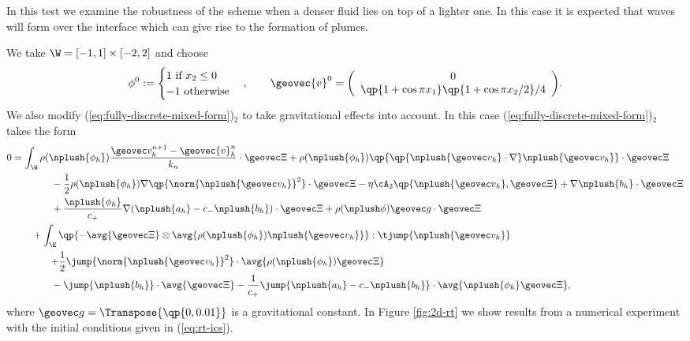 \documentclass[final]{amsart}
\numberwithin{equation}{section}
\begin{document}
{
In this test we examine the robustness of the scheme when a denser
fluid lies on top of a lighter one. In this case it is expected that
waves will form over the interface which can give rise to
the formation of plumes. 
}

{
We take $\W = [-1,1]\times [-2,2]$ and choose
\begin{equation}
  \label{eq:rt-ics}
  \phi^0 :=
  \begin{cases}
    1 \text{ if } x_2 \leq 0
    \\
    -1 \text{ otherwise}
  \end{cases},
  \qquad {\geovec{v}}^0 = 
  \bigg(
    \begin{array}{c}
      0
      \\
      {\qp{1+\cos{{\pi x_1}}} \qp{1+\cos{{{\pi x_2}/{2}}}}}/{4}
    \end{array}
    \bigg).
\end{equation}
We also modify (\ref{eq:fully-discrete-mixed-form})$_2$ to take
gravitational effects into account. In this case
(\ref{eq:fully-discrete-mixed-form})$_2$ takes the form
\begin{equation}
  \begin{split}
    0 &=
  \int_\W 
  \rho(\nplush{\phi_h}) \frac{\geovec v_h^{n+1} - {\geovec{v}}_h^n}{k_n} \cdot \geovec \Xi
  +
    \rho(\nplush{\phi_h}) \qp{ \qp{\nplush{\geovec v_h} \cdot \nabla }\nplush{\geovec v_h}} \cdot \geovec \Xi
    \\
    &\qquad\qquad-
    \frac{1}{2} \rho(\nplush{\phi_h}) \nabla\qp{\norm{\nplush{\geovec v_h}}^2} \cdot \geovec \Xi
    -
    \eta\cA_2\qp{{\nplush{\geovec v_h}},{\geovec \Xi}}
    +
    \nabla \nplush{b_h} \cdot \geovec \Xi
    \\
    &\qquad\qquad +
    \frac{\nplush{\phi_h}}{c_+}\nabla(\nplush{a_h} - c_- \nplush{b_h}) \cdot \geovec \Xi
    +
    \rho(\nplush\phi)\geovec g  \cdot \geovec \Xi
    \\
    & \qquad +
    \int_\E
    \qp{{-}\avg{ \geovec \Xi} \otimes \avg{ \rho(\nplush{\phi_h}) \nplush{\geovec v_h}}}: \tjump{\nplush{\geovec v_h}} 
    \\&\qquad \qquad {+}
    \frac{1}{2} \jump{\norm{\nplush{\geovec v_h}}^2}\cdot \avg{\rho(\nplush{\phi_h}) \geovec \Xi}
    \\ 
    &\qquad\qquad
    -
    \jump{\nplush{b_h}} \cdot \avg{\geovec \Xi}
    -
    \frac{1}{c_+}\jump{\nplush{ a_h} - c_-\nplush{ b_h}} \cdot \avg{\nplush{\phi_h} \geovec \Xi},
    \end{split}
\end{equation}
where $\geovec g = \Transpose{\qp{0, 0.01}}$ is a gravitational
constant. In Figure \ref{fig:2d-rt} we show results from a numerical
experiment with the initial conditions given in (\ref{eq:rt-ics}).  }
\end{document}
